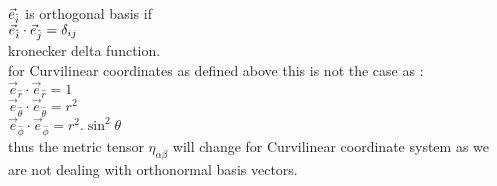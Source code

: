 \documentclass[11pt,a4paper]{article}
\begin{document}
\begin{enumerate}
\begin{enumerate}
\begin{enumerate}
                                    $\vec{e}_{\Hat{i}}$ is orthogonal basis if \\
                                    $\vec{e}_{\Hat{i}}\cdot \vec{e}_{\Hat{j}} = \delta_{ij}$\\
                                    kronecker delta function.\\
                                    for Curvilinear coordinates as defined above this is not the case as :\\
                                    $\vec{e}_{\hat{r}} \cdot \vec{e}_{\hat{r}} = 1 $\\
                                    $\vec{e}_{\hat{\theta}} \cdot \vec{e}_{\hat{\theta}} = r^2 $\\
                                    $\vec{e}_{\hat{\phi}} \cdot \vec{e}_{\hat{\phi}} = r^2.\sin^2\theta $\\
                                    thus the metric tensor ${\displaystyle{\eta_{\alpha\beta}}}$ will change for Curvilinear coordinate system as we are not dealing with orthonormal basis vectors.


\end{enumerate}
\end{enumerate}
\end{enumerate}
\end{document}

